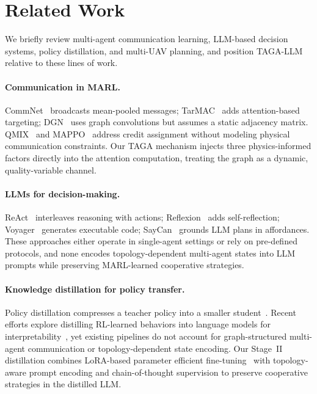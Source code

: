 
\section{Related Work}
\label{sec:related}

We briefly review multi-agent communication learning, LLM-based decision
systems, policy distillation, and multi-UAV planning, and position TAGA-LLM
relative to these lines of work.

\paragraph{Communication in MARL.}
CommNet~\cite{sukhbaatar2016learning} broadcasts mean-pooled messages;
TarMAC~\cite{das2019tarmac} adds attention-based targeting;
DGN~\cite{jiang2020graph} uses graph convolutions but assumes a static
adjacency matrix.  QMIX~\cite{rashid2018qmix} and
MAPPO~\cite{yu2022surprising} address credit assignment without modeling
physical communication constraints.  Our TAGA mechanism injects three
physics-informed factors directly into the attention computation, treating the
graph as a dynamic, quality-variable channel.

\paragraph{LLMs for decision-making.}
ReAct~\cite{yao2023react} interleaves reasoning with actions;
Reflexion~\cite{shinn2023reflexion} adds self-reflection;
Voyager~\cite{wang2023voyager} generates executable code;
SayCan~\cite{ahn2022saycan} grounds LLM plans in affordances.  These
approaches either operate in single-agent settings or rely on pre-defined
protocols, and none encodes topology-dependent multi-agent states into LLM
prompts while preserving MARL-learned cooperative strategies.

\paragraph{Knowledge distillation for policy transfer.}
Policy distillation compresses a teacher policy into a smaller
student~\cite{rusu2016policy}.  Recent efforts explore distilling RL-learned
behaviors into language models for
interpretability~\cite{brown2020language,li2023camel}, yet existing pipelines
do not account for graph-structured multi-agent communication or
topology-dependent state encoding.  Our Stage~II distillation combines
LoRA-based parameter efficient fine-tuning~\cite{hu2022lora} with
topology-aware prompt encoding and chain-of-thought supervision to preserve
cooperative strategies in the distilled LLM.

